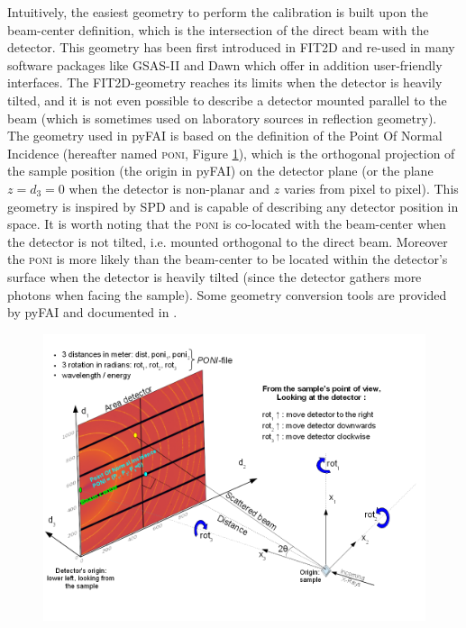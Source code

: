 \documentclass[preprint]{iucr}              %
\let\caption\foo
\begin{document}
Intuitively, the easiest geometry to perform the calibration is built upon 
the beam-center definition, which is the intersection of the direct beam with the detector. 
This geometry has been first introduced in FIT2D \cite{fit2d} 
and re-used in many software packages like GSAS-II \cite{Toby:aj5212} and 
Dawn \cite{Filik:vg5068} which offer in addition user-friendly interfaces.
The FIT2D-geometry reaches its limits when the detector is heavily tilted, and it is not 
even possible to describe a detector mounted parallel to the beam 
(which is sometimes used on laboratory sources in reflection geometry).
The geometry used in pyFAI is based on the definition of the Point Of Normal Incidence 
(hereafter named \textsc{poni}, Figure \ref{poni}), which is 
the orthogonal projection of the sample position (the origin in pyFAI) on the detector plane (or
the plane $z=d_3=0$ when the detector is non-planar and $z$ varies from pixel to pixel).
This geometry is inspired by SPD \cite{Boesecke:aj6013} and is capable of describing any 
detector position in space. 
It is worth noting that the \textsc{poni} is co-located with the beam-center when the 
detector is not tilted, i.e. mounted orthogonal to the direct beam. 
Moreover the \textsc{poni} is more likely than the beam-center to be located within the detector's 
surface when the detector is heavily tilted (since the detector gathers more photons when facing the sample). 
Some geometry conversion tools are provided by pyFAI and documented in .

\begin{figure}
\label{poni}
\begin{center}
\includegraphics[width=15cm]{images/PONI}
\caption{Geometry used in pyFAI.}
\end{center}
\end{figure}
\end{document}
